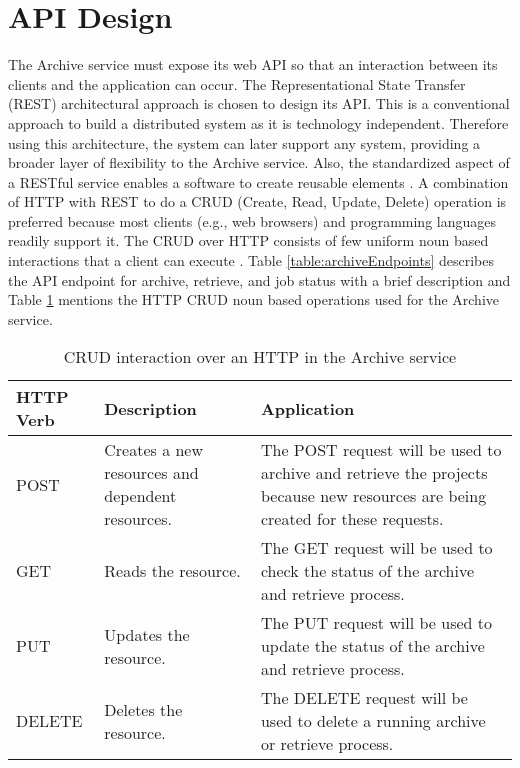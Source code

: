 \section{API Design}
\label{section:APIDesign}
    The Archive service must expose its web API so that an interaction between its clients and the application can occur.
    The Representational State Transfer (REST) \cite[Chapter.~5]{REST} architectural approach is chosen to design its API. This is a 
    conventional approach to build a distributed system as it is technology independent. Therefore using this architecture, the system can later 
    support any system, providing a broader layer of flexibility to the Archive service. 
    Also, the standardized aspect of a RESTful service enables a software to create reusable elements \cite{RESTThesis}. A combination of HTTP with REST 
    to do a CRUD (Create, Read, Update, Delete) operation is preferred because most clients (e.g., web browsers) and programming languages readily support it.
    The CRUD over HTTP consists of few uniform noun based interactions that a client can execute \cite[p.~13]{RESTThesis}.
    Table \ref{table:archiveEndpoints} describes the API endpoint for archive, retrieve, and job status with a brief description and 
    Table \ref{table:curdHttp} mentions the HTTP CRUD noun based operations used for the Archive service.

    \begin{table}[H]
        \centering
        \begin{tabular}{|p{2cm}|p{4cm}|p{7.5cm}|}
            \hline
                \textbf{HTTP Verb}  & \textbf{Description} & \textbf{Application}\\
            \hline
                POST & 
                Creates a new resources and dependent resources.
                & The POST request will be used to archive and retrieve the projects because new resources are being created for these requests.\\
            \hline
                GET & Reads the resource. & The GET request will be used to check the status of the archive and retrieve process. \\
            \hline
            PUT & Updates the resource. & The PUT request will be used to update the status of the archive and retrieve process. \\
            \hline
                DELETE & Deletes the resource. & The DELETE request will be used to delete a running archive or retrieve process. \\                
            \hline
        \end{tabular}
        \caption{CRUD interaction over an HTTP in the Archive service}
        \label{table:curdHttp}     
    \end{table}   
    

